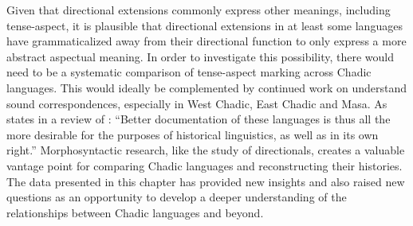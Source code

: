Given that directional extensions commonly express other meanings, including tense-aspect, it is plausible that directional extensions in at least some languages have grammaticalized away from their directional function to only express a more abstract aspectual meaning. In order to investigate this possibility, there would need to be a systematic comparison of tense-aspect marking across Chadic languages. This would ideally be complemented by continued work on understand sound correspondences, especially in West Chadic, East Chadic and Masa. As \citet{souagEkkehardWolffHistorical2023} states in a review of \citet{wolffHistoricalPhonologyCentral2021}: ``Better documentation of these languages is thus all the more desirable for the purposes of historical linguistics, as well as in its own right.'' Morphosyntactic research, like the study of directionals, creates a valuable vantage point for comparing Chadic languages and reconstructing their histories. The data presented in this chapter has provided new insights and also raised new questions as an opportunity to develop a deeper understanding of the relationships between Chadic languages and beyond.
